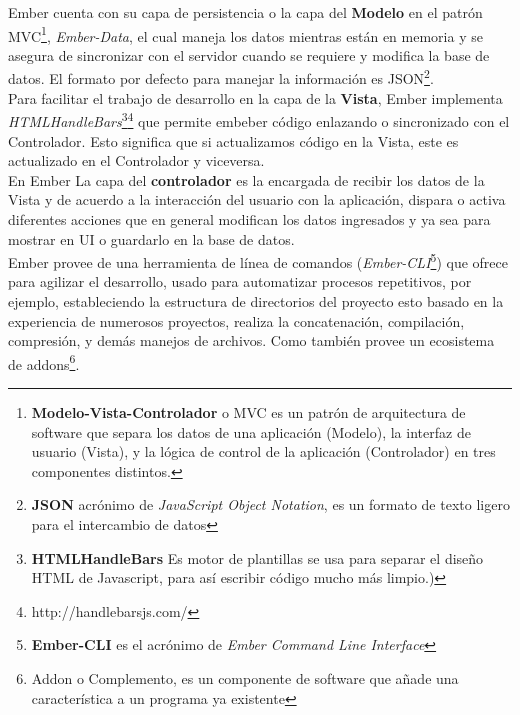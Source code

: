 Ember cuenta con su capa de persistencia o la capa del \textbf{Modelo} en el patrón MVC\footnote{\textbf{Modelo-Vista-Controlador} o MVC es un patrón de arquitectura de software que separa los datos de una aplicación (Modelo), la interfaz de usuario (Vista), y la lógica de control de la aplicaci\'on (Controlador) en tres componentes distintos\cite{mvc}.}, \emph{Ember-Data}, el cual maneja los datos mientras están en memoria y se asegura de sincronizar con el servidor cuando se requiere y modifica la base de datos. El formato por defecto para manejar la información es JSON\footnote{\textbf{JSON} acr\'onimo de \emph{JavaScript Object Notation}, es un formato de texto ligero para el intercambio de datos}.\\

Para facilitar el trabajo de desarrollo en la capa de la \textbf{Vista}, Ember implementa \emph{HTMLHandleBars}\footnote{\textbf{HTMLHandleBars} Es motor de plantillas se usa para separar el diseño HTML de Javascript, para así escribir código mucho más limpio.)}\footnote{http://handlebarsjs.com/} que permite embeber código enlazando o sincronizado con el Controlador. Esto significa que si actualizamos código en la Vista, este es actualizado en el Controlador y viceversa.\\


En Ember La capa del \textbf{controlador} es  la encargada de recibir los datos de la Vista y de acuerdo a la interacción del usuario con la aplicación, dispara o activa diferentes acciones que en general modifican los datos ingresados y ya sea para mostrar en UI o guardarlo en la base de datos.\\


Ember provee de una herramienta de línea de comandos (\emph{Ember-CLI}\footnote{\textbf{Ember-CLI} es el acrónimo de \emph{Ember Command Line Interface}}) que ofrece para agilizar el desarrollo, usado para automatizar procesos repetitivos, por ejemplo, estableciendo la estructura de directorios del proyecto esto basado en la experiencia de numerosos proyectos, realiza la concatenación, compilación, compresión, y demás manejos de archivos. Como también provee un ecosistema de addons\footnote{Addon o Complemento, es un componente de software que añade una característica a un programa ya existente}.\\

